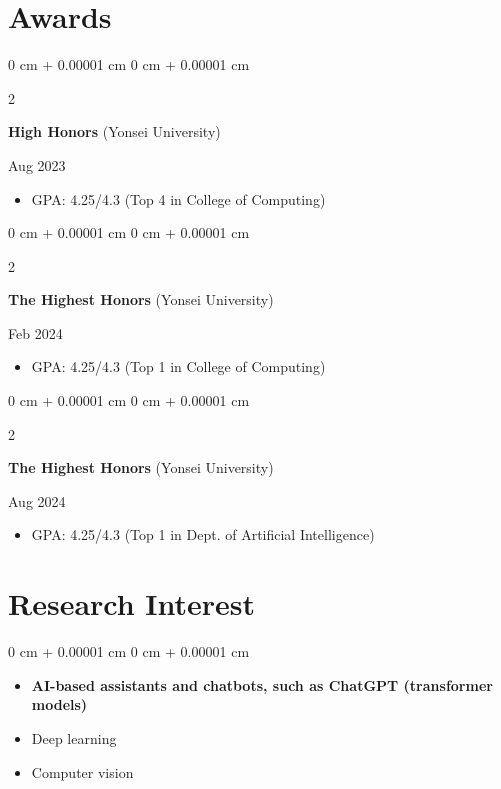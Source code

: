 \documentclass[10pt, letterpaper]{article}
\newenvironment{highlights}{
    \begin{itemize}[
        topsep=0.10 cm,
        parsep=0.10 cm,
        partopsep=0pt,
        itemsep=0pt,
        leftmargin=0 cm + 10pt
    ]
}{
    \end{itemize}
} %
\newenvironment{onecolentry}{
    \begin{adjustwidth}{
        0 cm + 0.00001 cm
    }{
        0 cm + 0.00001 cm
    }
}{
    \end{adjustwidth}
} %
\newenvironment{twocolentry}[2][]{
    \onecolentry
    \def\secondColumn{#2}
    \setcolumnwidth{\fill, 4.5 cm}
    \begin{paracol}{2}
}{
    \switchcolumn \raggedleft \secondColumn
    \end{paracol}
    \endonecolentry
} %
\begin{document}
    \section{Awards}
        \begin{twocolentry}{
            Aug 2023
        }
            \textbf{High Honors} (Yonsei University)
        \end{twocolentry}
        \begin{highlights}
            \item GPA: 4.25/4.3 (Top 4 in College of Computing)
        \end{highlights}
        \vspace{0.10 cm}
        \begin{twocolentry}{
            Feb 2024
        }
            \textbf{The Highest Honors} (Yonsei University)
        \end{twocolentry}
        \begin{highlights}
            \item GPA: 4.25/4.3 (Top 1 in College of Computing)
        \end{highlights}
        \vspace{0.10 cm}
        \begin{twocolentry}{
            Aug 2024
        }
            \textbf{The Highest Honors} (Yonsei University)
        \end{twocolentry}
        \begin{highlights}
            \item GPA: 4.25/4.3 (Top 1 in Dept. of Artificial Intelligence)
        \end{highlights}
        \vspace{0.10 cm}

    \section{Research Interest}
        \begin{onecolentry}
            \begin{highlights}
                \item \textbf{AI-based assistants and chatbots, such as ChatGPT (transformer models)}
                \item Deep learning
                \item Computer vision
            \end{highlights}
        \end{onecolentry}
\end{document}
